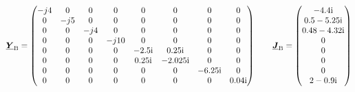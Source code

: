 \begin{exemple}
    \[
       \mcmplx{Y}\ped{B} =
       \begin{pmatrix}
         -j 4 & 0 & 0 & 0 & 0 & 0 & 0 & 0 \\
         0 & -j 5 & 0 & 0 & 0 & 0 & 0 & 0 \\
         0 & 0 & -j 4 & 0 & 0 & 0 & 0 & 0 \\
         0 & 0 & 0 & -j 10 & 0 & 0 & 0 & 0 \\
         0 & 0 & 0 & 0 & \complexnum{-j 2,5} & \complexnum{j 0,25} & 0 & 0 \\
         0 & 0 & 0 & 0 & \complexnum{j 0,25} & \complexnum{-j 2,025} & 0 & 0 \\
         0 & 0 & 0 & 0 & 0 & 0 & \complexnum{-j 6,25} & 0 \\
         0 & 0 & 0 & 0 & 0 & 0 & 0 & \complexnum{j 0,04}
       \end{pmatrix}
       \qquad
       \mcmplx{J}\ped{B} =
       \begin{pmatrix}
        \complexnum{-j 4,4} \\
        \complexnum{0,5 - j 5,25} \\
        \complexnum{0,48 - j 4,32} \\
        0 \\
        0 \\
        0 \\
        0 \\
        \complexnum{2 - j 0,9}
       \end{pmatrix}
    \]


\end{exemple}
